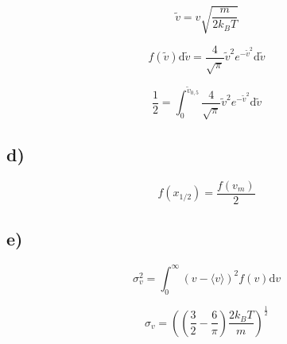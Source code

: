\begin{equation}
  \tilde{v} = v \sqrt{\frac{m}{2k_BT}}
\end{equation}

\begin{equation}
  f\left(\tilde{v}\right) \text{d}\tilde{v} = \frac{4}{\sqrt{\pi}}\tilde{v}^2 e^{-\tilde{v}^2} \text{d}\tilde{v}
\end{equation}

\begin{equation}
  \frac{1}{2}=\int^{\tilde{v}_{0,5}}_{0} \frac{4}{\sqrt{\pi}}\tilde{v}^2 e^{-\tilde{v}^2} \text{d}\tilde{v}
\end{equation}

\subsection{d)}

\begin{equation}
  f(x_{1/2})=\frac{f(v_m)}{2}
\end{equation}


\subsection{e)}

\begin{equation}
  \sigma^2_v=\int^{\infty}_{0} \left(v-\langle v \rangle \right)^2 f(v) \text{d}v
\end{equation}

\begin{equation}
  \sigma_v = \left(\left( \frac{3}{2}- \frac{6}{\pi}\right) \frac{2k_BT}{m}             \right)^{\frac{1}{2}}
\end{equation}
